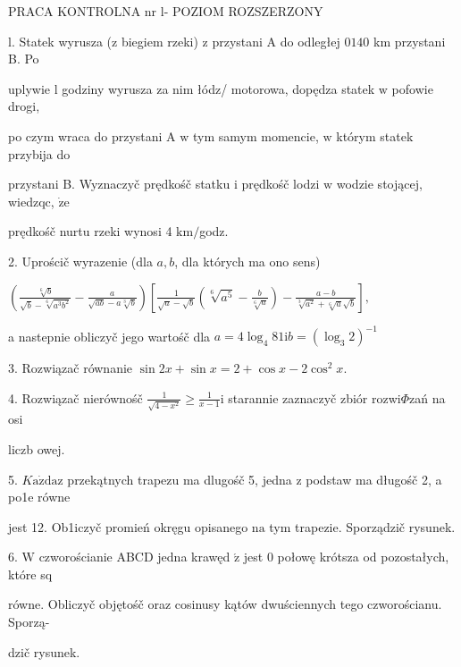 \documentclass[a4paper,12pt]{article}
\begin{document}
PRACA KONTROLNA nr l- POZIOM ROZSZERZONY

l. Statek wyrusza ($\mathrm{z}$ biegiem rzeki) $\mathrm{z}$ przystani A do odległej $0 140$ km przystani B. Po

uplywie l godziny wyrusza za nim łódz/ motorowa, dopędza statek $\mathrm{w}$ pofowie drogi,

po czym wraca do przystani A $\mathrm{w}$ tym samym momencie, $\mathrm{w}$ którym statek przybija do

przystani B. Wyznaczyč prędkośč statku $\mathrm{i}$ prędkośč lodzi $\mathrm{w}$ wodzie stojącej, wiedzqc, $\dot{\mathrm{z}}\mathrm{e}$

prędkośč nurtu rzeki wynosi 4 $\mathrm{k}\mathrm{m}/$godz.

2. Uprościč wyrazenie (dla $a, b$, dla których ma ono sens)

$(\displaystyle \frac{\sqrt[6]{b}}{\sqrt{b}-\sqrt[6]{a^{3}b^{2}}}-\frac{a}{\sqrt{ab}-a\sqrt[3]{b}})[\frac{1}{\sqrt{a}-\sqrt{b}}(\sqrt[6]{a^{5}}-\frac{b}{\sqrt[6]{a}})-\frac{a-b}{\sqrt[3]{a^{2}}+\sqrt[6]{a}\sqrt{b}}],$

a nastepnie obliczyč jego wartośč dla $a=4\log_{4}81 \mathrm{i} b=(\log_{3}2)^{-1}$

3. Rozwiązač równanie $\sin 2x+\sin x=2+\cos x-2\cos^{2}x.$

4. Rozwiązač nierównośč $\displaystyle \frac{1}{\sqrt{4-x^{2}}}\geq\frac{1}{x-1} \mathrm{i}$ starannie zaznaczyč zbiór rozwi$\Phi$zań na osi

liczb owej.

5. $K\mathrm{a}\dot{\mathrm{z}}\mathrm{d}\mathrm{a}\mathrm{z}$ przekątnych trapezu ma dlugośč 5, jedna $\mathrm{z}$ podstaw ma długośč 2, a po1e równe

jest 12. Ob1iczyč promień okręgu opisanego $\mathrm{n}\mathrm{a}$ tym trapezie. Sporządzič rysunek.

6. $\mathrm{W}$ czworościanie ABCD jedna krawęd $\acute{\mathrm{z}}$ jest $0$ połowę krótsza od pozostałych, które sq

równe. Obliczyč objętośč oraz cosinusy kątów dwuściennych tego czworościanu. Sporzą-

dzič rysunek.
\end{document}
